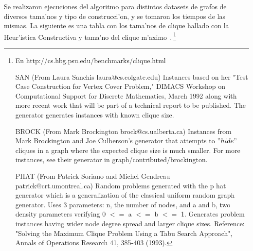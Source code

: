 Se realizaron ejecuciones del algoritmo para distintos datasets de grafos de diversos tama'nos y tipo de construcci'on, y se tomaron los tiempos de las mismas.
La siguiente es una tabla con los tama'nos de clique hallado con la Heur'istica Constructiva y tama'no del clique m'aximo .
\footnote{
En http://cs.hbg.psu.edu/benchmarks/clique.html	

SAN (From Laura Sanchis laura@cs.colgate.edu) Instances based on her "Test Case Construction for Vertex Cover Problem," DIMACS Workshop on Computational Support for Discrete Mathematics, March 1992 along with more recent work that will be part of a technical report to be published. The generator generates instances with known clique size.

BROCK (From Mark Brockington brock@cs.ualberta.ca) Instances from Mark Brockington and Joe Culberson's generator that attempts to $"hide"$ cliques in a graph where the expected clique size is much smaller. For more instances, see their generator in graph/contributed/brockington.

PHAT (From Patrick Soriano and Michel Gendreau patrick@crt.umontreal.ca) Random problems generated with the p hat generator which is a generalization of the classical uniform random graph generator. Uses 3 parameters: n, the number of nodes, and a and b, two density parameters verifying 0 $<=$ a $<=$ b $<=$ 1. Generates problem instances having wider node degree spread and larger clique sizes. Reference: "Solving the Maximum Clique Problem Using a Tabu Search Approach", Annals of Operations Research 41, 385-403 (1993).
}

